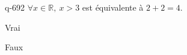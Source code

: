 \begin{truefalse}{q-692}
$\forall x \in \mathbb R,\: x>3$ est équivalente à $2+2=4$.
\item Vrai
\item* Faux
\end{truefalse}

